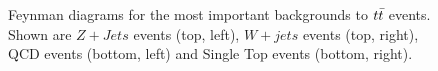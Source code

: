 \begin{figure}
  \begin{center}
     \\
     \\
  \end{center}
  \caption{Feynman diagrams for the most important backgrounds to $t\bar{t}$ events.  Shown are $Z+Jets$ events (top, left), $W+jets$ events (top, right), QCD events (bottom, left) and Single Top events (bottom, right).}
  \label{img:BackgroundsFeynmanDiagrams}
\end{figure}

